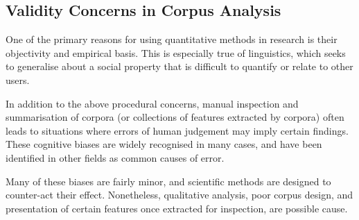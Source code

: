 \subsection{Validity Concerns in Corpus Analysis}
One of the primary reasons for using quantitative methods in research is their objectivity and empirical basis.  This is especially true of linguistics, which seeks to generalise about a social property that is difficult to quantify or relate to other users.

In addition to the above procedural concerns, manual inspection and summarisation of corpora (or collections of features extracted by corpora) often leads to situations where errors of human judgement may imply certain findings.  These cognitive biases are widely recognised in many cases, and have been identified in other fields as common causes of error\cite{jain2012does,lieberman2009type}.

Many of these biases are fairly minor, and scientific methods are designed to counter-act their effect.  Nonetheless, qualitative analysis, poor corpus design, and presentation of certain features once extracted for inspection, are possible cause.


